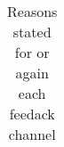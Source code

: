 \begin{table}[h]
\begin{tabular}{ll}
\end{tabular}
\caption{Reasons stated for or again each feedack channel}
\label{table:interview-coding}
\end{table}